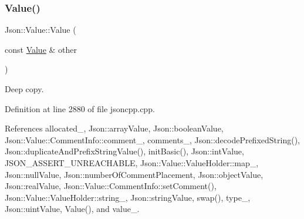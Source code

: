 \subsubsection{\texorpdfstring{Value()}{Value()}\hspace{0.1cm}{\footnotesize\ttfamily [12/12]}}
{\footnotesize\ttfamily Json\+::\+Value\+::\+Value (\begin{DoxyParamCaption}\item[{const \hyperlink{class_json_1_1_value}{Value} \&}]{other }\end{DoxyParamCaption})}



Deep copy. 



Definition at line 2880 of file jsoncpp.\+cpp.



References allocated\+\_\+, Json\+::array\+Value, Json\+::boolean\+Value, Json\+::\+Value\+::\+Comment\+Info\+::comment\+\_\+, comments\+\_\+, Json\+::decode\+Prefixed\+String(), Json\+::duplicate\+And\+Prefix\+String\+Value(), init\+Basic(), Json\+::int\+Value, J\+S\+O\+N\+\_\+\+A\+S\+S\+E\+R\+T\+\_\+\+U\+N\+R\+E\+A\+C\+H\+A\+B\+LE, Json\+::\+Value\+::\+Value\+Holder\+::map\+\_\+, Json\+::null\+Value, Json\+::number\+Of\+Comment\+Placement, Json\+::object\+Value, Json\+::real\+Value, Json\+::\+Value\+::\+Comment\+Info\+::set\+Comment(), Json\+::\+Value\+::\+Value\+Holder\+::string\+\_\+, Json\+::string\+Value, swap(), type\+\_\+, Json\+::uint\+Value, Value(), and value\+\_\+.


